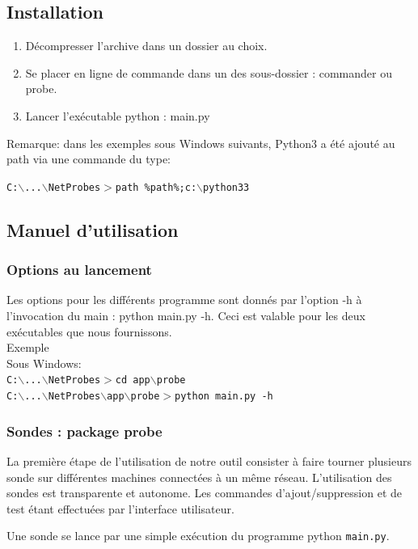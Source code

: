\documentclass[a4paper,11pt]{article}
\begin{document}
\subsection{Installation}
\begin{enumerate}
\item Décompresser l'archive dans un dossier au choix.
\item Se placer en ligne de commande dans un des sous-dossier : commander ou probe.
\item Lancer l'exécutable python : main.py
\end{enumerate}
Remarque: dans les exemples sous Windows suivants, Python3 a été ajouté au path via une commande du type:
\begin{center} \texttt{{\color{blue}C:$\backslash$...$\backslash$NetProbes$>$}path \%path\%;c:$\backslash$python33} \end{center}

\subsection{Manuel d'utilisation}

\subsubsection{Options au lancement}
Les options pour les différents programme sont donnés par l'option -h à l'invocation du main : python main.py -h.
Ceci est valable pour les deux exécutables que nous fournissons.\\
Exemple\\
Sous Windows:\\
\texttt{{\color{blue}C:$\backslash$...$\backslash$NetProbes$>$}cd app$\backslash$probe}\\
\texttt{{\color{blue}C:$\backslash$...$\backslash$NetProbes$\backslash$app$\backslash$probe$>$}python main.py -h}

\subsubsection{Sondes : package probe}
La première étape de l'utilisation de notre outil consister à faire tourner plusieurs sonde sur différentes machines connectées à un même réseau. L'utilisation des sondes est transparente et autonome. Les commandes d'ajout/suppression et de test étant effectuées par l'interface utilisateur.

Une sonde se lance par une simple exécution du programme python \texttt{main.py}.
\end{document}
